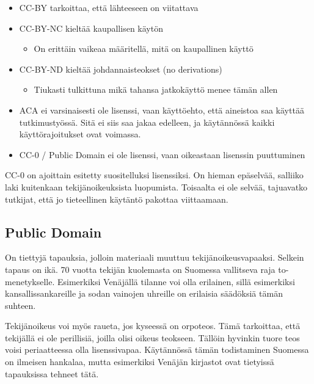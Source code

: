 \documentclass[]{book}
\providecommand{\tightlist}{%
  \setlength{\itemsep}{0pt}\setlength{\parskip}{0pt}}
\begin{document}
\begin{itemize}
\tightlist
\item
  CC-BY tarkoittaa, että lähteeseen on viitattava
\item
  CC-BY-NC kieltää kaupallisen käytön

  \begin{itemize}
  \tightlist
  \item
    On erittäin vaikeaa määritellä, mitä on kaupallinen käyttö
  \end{itemize}
\item
  CC-BY-ND kieltää johdannaisteokset (no derivations)

  \begin{itemize}
  \tightlist
  \item
    Tiukasti tulkittuna mikä tahansa jatkokäyttö menee tämän allen
  \end{itemize}
\item
  ACA ei varsinaisesti ole lisenssi, vaan käyttöehto, että aineistoa saa
  käyttää tutkimustyössä. Sitä ei siis saa jakaa edelleen, ja
  käytännössä kaikki käyttörajoitukset ovat voimassa.
\item
  CC-0 / Public Domain ei ole lisenssi, vaan oikeastaan lisenssin
  puuttuminen
\end{itemize}

CC-0 on ajoittain esitetty suositelluksi lisenssiksi. On hieman
epäselvää, salliiko laki kuitenkaan tekijänoikeuksista luopumista.
Toisaalta ei ole selvää, tajuavatko tutkijat, että jo tieteellinen
käytäntö pakottaa viittaamaan.

\hypertarget{public-domain}{%
\subsection{Public Domain}\label{public-domain}}

On tiettyjä tapauksia, jolloin materiaali muuttuu tekijänoikeusvapaaksi.
Selkein tapaus on ikä. 70 vuotta tekijän kuolemasta on Suomessa
vallitseva raja to-menetykselle. Esimerkiksi Venäjällä tilanne voi olla
erilainen, sillä esimerkiksi kansallissankareille ja sodan vainojen
uhreille on erilaisia säädöksiä tämän suhteen.

Tekijänoikeus voi myös raueta, jos kyseessä on orpoteos. Tämä
tarkoittaa, että tekijällä ei ole perillisiä, joilla olisi oikeus
teokseen. Tällöin hyvinkin tuore teos voisi periaatteessa olla
lisenssivapaa. Käytännössä tämän todistaminen Suomessa on ilmeisen
hankalaa, mutta esimerkiksi Venäjän kirjastot ovat tietyissä tapauksissa
tehneet tätä.
\end{document}
